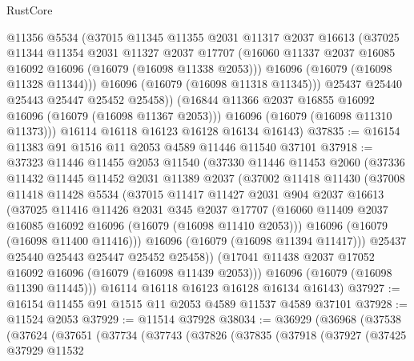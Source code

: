 \begin{lexlean}{RustCore}
\begin{coremodule}
            @11356
            @5534
            (@37015
              @11345
              @11355
              @2031
              @11317
              @2037
              @16613
              (@37025
                @11344
                @11354
                @2031
                @11327
                @2037
                @17707
                (@16060 @11337 @2037 @16085 @16092 @16096 (@16079 (@16098 @11338 @2053)))
                @16096
                (@16079 (@16098 @11328 @11344)))
              @16096
              (@16079 (@16098 @11318 @11345)))
            @25437
            @25440
            @25443
            @25447
            @25452
            @25458))
        (@16844 @11366 @2037 @16855 @16092 @16096 (@16079 (@16098 @11367 @2053)))
        @16096
        (@16079 (@16098 @11310 @11373)))
      @16114
      @16118
      @16123
      @16128
      @16134
      @16143)
@37835 := @16154 @11383 @91 @1516 @11 @2053 @4589 @11446 @11540 @37101
@37918 := @37323
    @11446
    @11455
    @2053
    @11540
    (@37330
      @11446
      @11453
      @2060
      (@37336
        @11432
        @11445
        @11452
        @2031
        @11389
        @2037
        (@37002
          @11418
          @11430
          (@37008
            @11418
            @11428
            @5534
            (@37015
              @11417
              @11427
              @2031
              @904
              @2037
              @16613
              (@37025
                @11416
                @11426
                @2031
                @345
                @2037
                @17707
                (@16060 @11409 @2037 @16085 @16092 @16096 (@16079 (@16098 @11410 @2053)))
                @16096
                (@16079 (@16098 @11400 @11416)))
              @16096
              (@16079 (@16098 @11394 @11417)))
            @25437
            @25440
            @25443
            @25447
            @25452
            @25458))
        (@17041 @11438 @2037 @17052 @16092 @16096 (@16079 (@16098 @11439 @2053)))
        @16096
        (@16079 (@16098 @11390 @11445)))
      @16114
      @16118
      @16123
      @16128
      @16134
      @16143)
@37927 := @16154 @11455 @91 @1515 @11 @2053 @4589 @11537 @4589 @37101
@37928 := @11524 @2053
@37929 := @11514 @37928
@38034 := @36929
    (@36968
      (@37538
        (@37624
          (@37651
            (@37734
              (@37743
                (@37826
                  (@37835
                    (@37918
                      (@37927
                        (@37425
                          @37929
                          @11532

\end{coremodule}
\end{lexlean}
